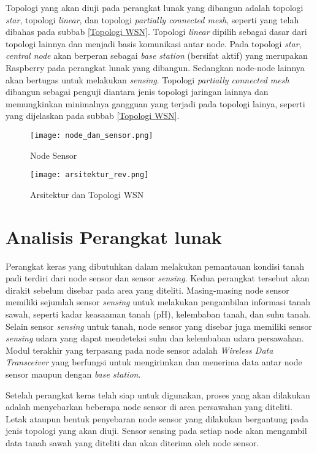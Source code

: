      
    Topologi yang akan diuji pada perangkat lunak yang dibangun adalah topologi \textit{star}, topologi \textit{linear}, dan topologi \textit{partially connected mesh}, seperti yang telah dibahas pada subbab \ref{Topologi WSN}. Topologi \textit{linear} dipilih sebagai dasar dari topologi lainnya dan menjadi basis komunikasi antar node. Pada topologi \textit{star}, \textit{central node} akan berperan sebagai \textit{base station} (bersifat aktif) yang merupakan Raspberry pada perangkat lunak yang dibangun. Sedangkan node-node lainnya akan bertugas untuk melakukan \textit{sensing}. Topologi \textit{partially connected mesh} dibangun sebagai penguji diantara jenis topologi jaringan lainnya dan memungkinkan minimalnya gangguan yang terjadi pada topologi lainya, seperti yang dijelaskan pada subbab \ref{Topologi WSN}.

    \begin{figure}[H]
    	\centering  
    	\texttt{[image: node\_dan\_sensor.png]}  
    	\caption[Node Sensor]{Node Sensor} 
    	\label{fig:Node Sensor} 
    \end{figure}

    \begin{figure}[H]
    	\centering  
    	\texttt{[image: arsitektur\_rev.png]}  
    	\caption[Arsitektur dan Topologi WSN]{Arsitektur dan Topologi WSN} 
    	\label{fig:Arsitektur dan Topologi WSN} 
    \end{figure}

\section{Analisis Perangkat lunak}
     Perangkat keras yang dibutuhkan dalam melakukan pemantauan kondisi tanah padi terdiri dari node sensor dan sensor \textit{sensing}. Kedua perangkat tersebut akan dirakit sebelum disebar pada area yang diteliti. Masing-masing node sensor memiliki sejumlah sensor \textit{sensing} untuk melakukan pengambilan informasi tanah sawah, seperti kadar keasaaman tanah (pH), kelembaban tanah, dan suhu tanah. Selain sensor \textit{sensing} untuk tanah, node sensor yang disebar juga memiliki sensor \textit{sensing} udara yang dapat mendeteksi suhu dan kelembaban udara persawahan. Modul terakhir yang terpasang pada node sensor adalah \textit{Wireless Data Transceiver} yang berfungsi untuk mengirimkan dan menerima data antar node sensor maupun dengan \textit{base station}.
     
     Setelah perangkat keras telah siap untuk digunakan, proses yang akan dilakukan adalah menyebarkan beberapa node sensor di area persawahan yang diteliti. Letak ataupun bentuk penyebaran node sensor yang dilakukan bergantung pada jenis topologi yang akan diuji. Sensor sensing pada setiap node akan mengambil data tanah sawah yang diteliti dan akan diterima oleh node sensor.
     
